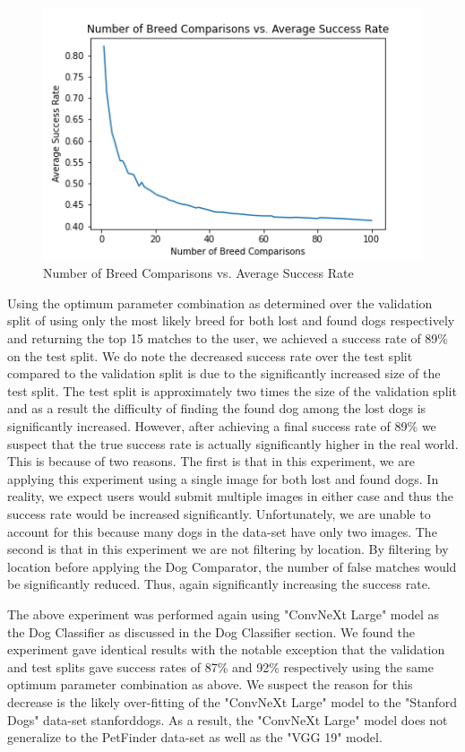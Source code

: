 \documentclass{article}
\begin{document}
\begin{figure}[h]
\centering
	\includegraphics[scale=0.7]{final-report-images/num_breed_comparison_accuracy.png}
\caption{Number of Breed Comparisons vs. Average Success Rate}
\label{fig:x breed comparisons}
\end{figure}
\newpage
Using the optimum parameter combination as determined over the validation split of using only the most likely breed for both lost and found dogs respectively and returning the top 15 matches to the user, we achieved a success rate of 89\% on the test split.  We do note the decreased success rate over the test split compared to the validation split is due to the significantly increased size of the test split.  The test split is approximately two times the size of the validation split and as a result the difficulty of finding the found dog among the lost dogs is significantly increased.  However, after achieving a final success rate of 89\% we suspect that the true success rate is actually significantly higher in the real world.  This is because of two reasons.  The first is that in this experiment, we are applying this experiment using a single image for both lost and found dogs.  In reality, we expect users would submit multiple images in either case and thus the success rate would be increased significantly.  Unfortunately, we are unable to account for this because many dogs in the data-set have only two images.  The second is that in this experiment we are not filtering by location.  By filtering by location before applying the Dog Comparator, the number of false matches would be significantly reduced.  Thus, again significantly increasing the success rate.

The above experiment was performed again using "ConvNeXt Large" model as the Dog Classifier as discussed in the Dog Classifier section.  We found the experiment gave identical results with the notable exception that the validation and test splits gave success rates of 87\% and 92\% respectively using the same optimum parameter combination as above.  We suspect the reason for this decrease is the likely over-fitting of the "ConvNeXt Large" model to the "Stanford Dogs" data-set {stanforddogs}.  As a result, the "ConvNeXt Large" model does not generalize to the PetFinder data-set as well as the "VGG 19" model.
\end{document}
